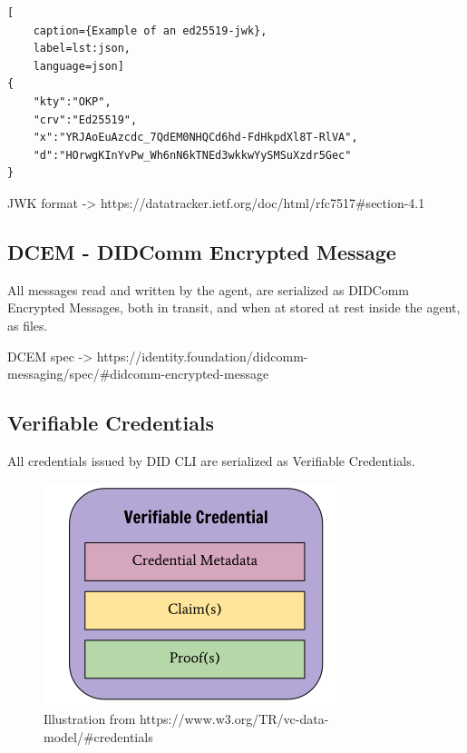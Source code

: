 \newpage

\begin{lstlisting}[
    caption={Example of an ed25519-jwk},
    label=lst:json,
    language=json]
{
	"kty":"OKP",
	"crv":"Ed25519",
	"x":"YRJAoEuAzcdc_7QdEM0NHQCd6hd-FdHkpdXl8T-RlVA",
	"d":"HOrwgKInYvPw_Wh6nN6kTNEd3wkkwYySMSuXzdr5Gec"
}
\end{lstlisting}

JWK format -> https://datatracker.ietf.org/doc/html/rfc7517#section-4.1



\subsection{DCEM - DIDComm Encrypted Message}

All messages read and written by the agent, are serialized as DIDComm Encrypted Messages, both in transit, and when at stored at rest inside the agent, as files.

DCEM spec -> https://identity.foundation/didcomm-messaging/spec/#didcomm-encrypted-message



\subsection{Verifiable Credentials}

All credentials issued by DID CLI are serialized as Verifiable Credentials.

    \begin{figure}[htbp]
      \centering
      \includegraphics[width=.7\textwidth]{figures/credential.png}
      \caption[]{Illustration from https://www.w3.org/TR/vc-data-model/#credentials}
    \end{figure}




